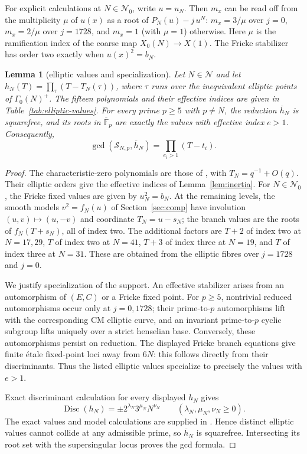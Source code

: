 \documentclass[11pt,a4paper]{article}
\numberwithin{equation}{section}
\newtheorem{lemma}[theorem]{Lemma}
\theoremstyle{definition}
\theoremstyle{remark}
\newcommand{\Fb}{\overline{\mathbb F}_p}
\begin{document}
For explicit calculations at $N\in\mathcal N_0$, write $u=u_N$.
Then $m_x$ can be read off from the multiplicity $\mu$ of $u(x)$ as a root of
$P_N(u)-j\,u^N$: $m_x=3/\mu$ over $j=0$, $m_x=2/\mu$ over $j=1728$, and $m_x=1$ (with $\mu=1$) otherwise.
Here $\mu$ is the ramification index of the coarse map $X_0(N)\to X(1)$.
The Fricke stabilizer has order two exactly when $u(x)^2=b_N$.

\begin{lemma}[elliptic values and specialization]\label{lem:elliptic-specialization}
Let $N\in\mathcal N$ and let
$h_N(T)=\prod_{\tau}(T-T_N(\tau))$, where $\tau$ runs over the
inequivalent elliptic points of $\Gamma_0(N)^+$.
The fifteen polynomials and their effective indices are given in
Table~\ref{tab:elliptic-values}.
For every prime $p\ge5$ with $p\ne N$, the reduction
$\overline h_N$ is squarefree, and its roots in $\Fb$ are exactly the
values with effective index $e>1$. Consequently,
\[
\gcd(\mathcal S_{N,p},\overline h_N)=\prod_{e_i>1}(T-t_i).
\]
\end{lemma}
\begin{proof}
The characteristic-zero polynomials are those of
\citet[\S4.2, Table~1]{JST19}, with $T_N=q^{-1}+O(q)$.
Their elliptic orders give the effective indices of
Lemma~\ref{lem:inertia}. For $N\in\mathcal N_0$, the Fricke fixed values
are given by $u_N^2=b_N$. At the remaining levels, the smooth models
$v^2=f_N(u)$ of Section~\ref{sec:comp} have involution
$(u,v)\mapsto(u,-v)$ and coordinate $T_N=u-s_N$;
the branch values are the roots of $f_N(T+s_N)$, all of index two.
The additional factors are $T+2$ of index two at $N=17,29$,
$T$ of index two at $N=41$, $T+3$ of index three at $N=19$,
and $T$ of index three at $N=31$. These are obtained from the
elliptic fibres over $j=1728$ and $j=0$.

We justify specialization of the support. An effective stabilizer arises
from an automorphism of $(E,C)$ or a Fricke fixed point. For $p\ge5$,
nontrivial reduced automorphisms occur only at $j=0,1728$; their
prime-to-$p$ automorphisms lift with the corresponding CM elliptic curve,
and an invariant prime-to-$p$ cyclic subgroup lifts uniquely over a
strict henselian base. Conversely, these automorphisms persist on reduction.
The displayed Fricke branch equations give finite \'etale fixed-point
loci away from $6N$: this follows directly from their discriminants.
Thus the listed elliptic values specialize to precisely the values with
$e>1$.

Exact discriminant calculation for every displayed $h_N$ gives
\[
\operatorname{Disc}(h_N)=\pm2^{\lambda_N}3^{\mu_N}N^{\nu_N}
\qquad(\lambda_N,\mu_N,\nu_N\ge0).
\]
The exact values and model calculations are supplied in
.
Hence distinct elliptic values cannot collide at any admissible prime,
so $\overline h_N$ is squarefree. Intersecting its root set with the
supersingular locus proves the gcd formula.
\end{proof}
\end{document}
